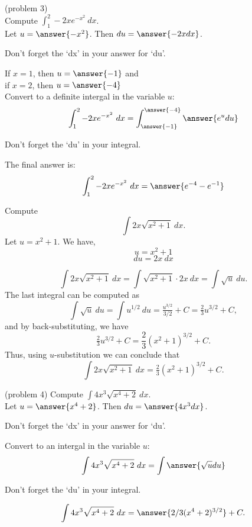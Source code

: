 \documentclass{ximera}
\begin{document}
\begin{problem}(problem 3)\\
Compute $\displaystyle{\int_1^2 -2xe^{-x^2} \ dx}$.\\
Let $u = \answer{-x^2}$. Then $du = \answer{-2x dx}$.\\
\begin{hint}
Don't forget the `dx' in your answer for `du'.
\end{hint}
If $x = 1$, then $u = \answer{-1}$ and \\
if $x = 2$, then $u = \answer{-4}$\\
Convert to a definite intergal in the variable $u$:
\[\int_1^2 -2xe^{-x^2} \ dx = \int_{\answer{-1}}^{\answer{-4}} \answer{e^u du}\]
\begin{hint}
Don't forget the `du' in your integral.
\end{hint}
The final answer is:
\[\int_1^2 -2xe^{-x^2} \ dx = \answer{e^{-4} - e^{-1}} \]
\end{problem}

\begin{example}[example 4] Compute 
\[\int 2x\sqrt{x^2 + 1} \ dx.\]
Let $u = x^2 + 1$.  We have,
\[u = x^2 + 1\]
\[du = 2x \ dx\]

\[\int 2x\sqrt{x^2 + 1} \ dx = \int \sqrt{x^2 + 1} \cdot 2x\  dx = \int \sqrt{u} \ du.\]
The last integral can be computed as 
\[\int \sqrt u  \ du = \int u^{1/2} \ du = \tfrac{u^{3/2}}{3/2} + C = \tfrac23 u^{3/2} + C,\]
and by back-substituting, we have 
\[\tfrac23 u^{3/2}  + C = \frac23 (x^2 + 1)^{3/2} + C.\]
Thus, using $u$-substitution we can conclude that
\[\int 2x\sqrt{x^2 + 1} \ dx =  \tfrac23 (x^2 + 1)^{3/2} + C.\]
\end{example}

\begin{problem}(problem 4) Compute $\displaystyle{\int 4x^3 \sqrt{x^4 +2} \ dx}$.\\
Let $u = \answer{x^4 + 2}$. Then $du = \answer{4x^3 dx}$.\\
\begin{hint}
Don't forget the `dx' in your answer for `du'.
\end{hint}
Convert to an intergal in the variable $u$:
\[\int 4x^3 \sqrt{x^4 +2} \ dx = \int\answer{\sqrt u du}\]
\begin{hint}
Don't forget the `du' in your integral.
\end{hint}

\[\int 4x^3 \sqrt{x^4 +2} \ dx = \answer{2/3(x^4 +2)^{3/2}} +C.\]
\end{problem}
\end{document}
